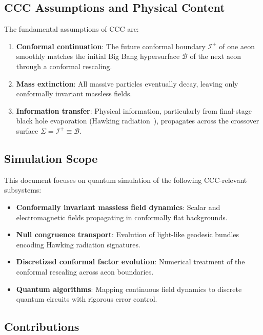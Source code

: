 \documentclass[11pt,a4paper]{article}
\theoremstyle{plain}
\theoremstyle{definition}
\theoremstyle{remark}
\begin{document}
\subsection{CCC Assumptions and Physical Content}

The fundamental assumptions of CCC are:
\begin{enumerate}
    \item \textbf{Conformal continuation}: The future conformal boundary $\mathscr{I}^+$ of one aeon smoothly matches the initial Big Bang hypersurface $\mathscr{B}$ of the next aeon through a conformal rescaling.
    \item \textbf{Mass extinction}: All massive particles eventually decay, leaving only conformally invariant massless fields.
    \item \textbf{Information transfer}: Physical information, particularly from final-stage black hole evaporation (Hawking radiation~\cite{hawking1975particle}), propagates across the crossover surface $\Sigma = \mathscr{I}^+ \equiv \mathscr{B}$.
\end{enumerate}

\subsection{Simulation Scope}

This document focuses on quantum simulation of the following CCC-relevant subsystems:
\begin{itemize}
    \item \textbf{Conformally invariant massless field dynamics}: Scalar and electromagnetic fields propagating in conformally flat backgrounds.
    \item \textbf{Null congruence transport}: Evolution of light-like geodesic bundles encoding Hawking radiation signatures.
    \item \textbf{Discretized conformal factor evolution}: Numerical treatment of the conformal rescaling across aeon boundaries.
    \item \textbf{Quantum algorithms}: Mapping continuous field dynamics to discrete quantum circuits with rigorous error control.
\end{itemize}

\subsection{Contributions}
\end{document}

